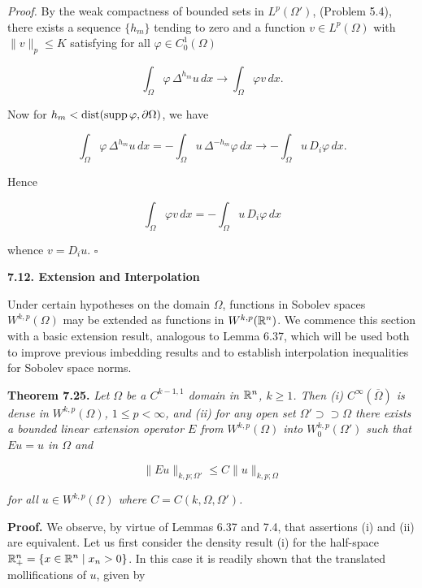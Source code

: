 \medskip

\textit{Proof.} By the weak compactness of bounded sets in $L^p(\Omega')$, (Problem 5.4), there
exists a sequence $\{h_m\}$ tending to zero and a function $v\in L^p(\Omega)$ with $\|v\|_p\le K$
satisfying for all $\varphi\in C_0^1(\Omega)$

\[
\int_{\Omega} \varphi\, \Delta^{h_m}u\,dx \to \int_{\Omega} \varphi v\,dx.
\]

Now for $h_m<\operatorname{dist}(\operatorname{supp}\varphi,\partial\Omega)$, we have

\[
\int_{\Omega} \varphi\, \Delta^{h_m}u\,dx = -\int_{\Omega} u\, \Delta^{-h_m}\varphi\,dx \to -\int_{\Omega} u\, D_i\varphi\,dx.
\]

Hence

\[
\int_{\Omega} \varphi v\,dx = -\int_{\Omega} u\,D_i\varphi\,dx
\]

whence $v=D_i u$. $\square$

\bigskip

\textbf{7.12. Extension and Interpolation}

Under certain hypotheses on the domain $\Omega$, functions in Sobolev spaces $W^{k,p}(\Omega)$
may be extended as functions in $W^{k,p}(\mathbb{R}^n)$. We commence this section with a basic
extension result, analogous to Lemma 6.37, which will be used both to improve
previous imbedding results and to establish interpolation inequalities for Sobolev
space norms.



\textbf{Theorem 7.25.} \emph{Let $\Omega$ be a $C^{k-1,1}$ domain in $\mathbb{R}^n$, $k \geq 1$. Then (i) $C^\infty(\overline{\Omega})$ is dense in $W^{k,p}(\Omega)$, $1 \leq p < \infty$, and (ii) for any open set $\Omega' \supset \supset \Omega$ there exists a bounded linear extension operator $E$ from $W^{k,p}(\Omega)$ into $W_0^{k,p}(\Omega')$ such that $Eu = u$ in $\Omega$ and}

\begin{equation}
\tag{7.54}
\|Eu\|_{k,p;\Omega'} \leq C\|u\|_{k,p;\Omega}
\end{equation}

\emph{for all $u \in W^{k,p}(\Omega)$ where $C = C(k,\Omega,\Omega')$.}

\textbf{Proof.} We observe, by virtue of Lemmas 6.37 and 7.4, that assertions (i) and (ii) are equivalent. Let us first consider the density result (i) for the half-space $\mathbb{R}_+^n = \{x \in \mathbb{R}^n \mid x_n > 0\}$. In this case it is readily shown that the translated mollifications of $u$, given by

